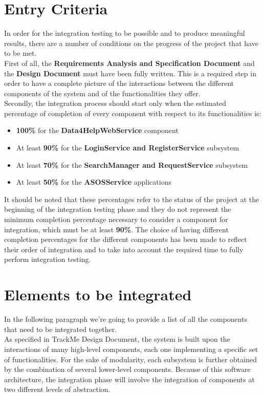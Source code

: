 \documentclass[a4paper, hidelinks, 12pt]{report}
\begin{document}
	\section{Entry Criteria}
	\label{sec:Entry Criteria}
	In order for the integration testing to be possible and to produce meaningful results, there are a number of conditions on the progress of the project that have to be met.\\
	\quad First of all, the \textbf{Requirements Analysis and Specification Document} and the \textbf{Design Document} must have been fully written. This is a required step in order to have a complete picture of the interactions between the different components of the system and of the functionalities they offer.\\
	\quad Secondly, the integration process should start only when the estimated percentage of completion of every component with respect to its functionalities is:
	\begin{itemize}
		\item{}\textbf{100\%} for the \textbf{Data4HelpWebService} component
		\item{}At least \textbf{90\%} for the \textbf{LoginService and RegisterService} subsystem
		\item{}At least \textbf{70\%} for the \textbf{SearchManager and RequestService} subsystem
		\item{}At least \textbf{50\%} for the \textbf{ASOSService} applications
		
	\end{itemize}
	It should be noted that these percentages refer to the status of the project at the beginning of the integration testing phase and they do not represent the minimum completion percentage necessary to consider a component for integration, which must be at least \textbf{90\%}. The choice of having different completion percentages for the different components has been made to reflect
their order of integration and to take into account the required time to fully perform integration testing.

	\section{Elements to be integrated}
	In the following paragraph we're going to provide a list of all the components that need to be integrated together.\\
	As specified in TrackMe Design Document, the system is built upon the interactions of many high-level components, each one implementing a specific set of functionalities. For the sake of modularity, each subsystem is further obtained by the combination of several lower-level components. Because of this software architecture, the integration phase will involve the integration of components at two different levels of abstraction.\\
	
\end{document}
